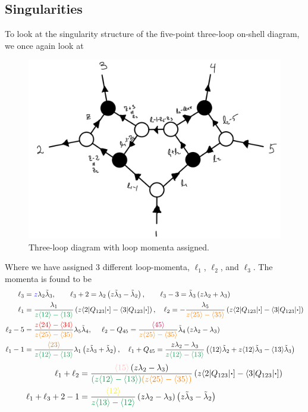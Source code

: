 \documentclass[letter,11pt]{article}
\newcommand{\pink}[1]{\textcolor{pink}{#1}}
\newcommand{\green}[1]{\textcolor{ForestGreen}{#1}}
\newcommand{\orange}[1]{\textcolor{orange}{#1}}
\newcommand{\brown}[1]{\textcolor{brown}{#1}}
\newcommand{\ab}[1]{\langle #1 \rangle}
\newcommand{\aMs}[3]{\langle #1|#2|#3]}  		%
\begin{document}
\subsection{Singularities}
To look at the singularity structure of the five-point three-loop on-shell diagram, we once again  look at 
\begin{figure}[H]
	\centering
	\includegraphics[width=0.5\linewidth]{5pt3l3}
	\caption{Three-loop diagram with loop momenta assigned.}
	\label{fig:5pt3l_2}
\end{figure}
Where we have assigned 3 different loop-momenta, $\ell_1$, $\ell_2$, and $\ell_3$. 
The momenta is found to be
\begin{equation}
	\begin{aligned}
\ell_3&=\textcolor{blue}{z} \lambda_2\tilde\lambda_3,~~~~~~
	\ell_3+2 = \lambda_2\left(z \tilde \lambda_3- \tilde \lambda_2\right)
,~~~~~~
	\ell_3-3 = \tilde \lambda_3\left(z  \lambda_2+ \lambda_3\right)\\
	\ell_1&=\frac{\lambda_1}{\green{z\ab{12}-\ab{13}}}\left(z\aMs{2}{Q_{123}}{\bm\cdot}-\aMs{3}{Q_{123}}{\bm\cdot}\right),~~~
	\ell_2=-\frac{\lambda_5}{\orange{z\ab{25}-\ab{35}}}\left(z\aMs{2}{Q_{123}}{\bm\cdot}-\aMs{3}{Q_{123}}{\bm\cdot}\right)
	\\
	\ell_2-5&=\frac{\textcolor{red}{z\ab{24}-\ab{34}}}{\orange{z\ab{25}-\ab{35}}}\lambda_5\tilde\lambda_4,~~~~\ell_2-Q_{45}=
	\frac{\textcolor{purple}{\ab{45}}}{\textcolor{orange}{z\ab{25}-\ab{35}}}\tilde\lambda_4\left(z\lambda_2-\lambda_3\right)\\
	\ell_1-1&=\frac{\brown{\ab{23}}}{\textcolor{ForestGreen}{z\ab{12}-\ab{13}}}\lambda_1\left(z\tilde \lambda_3+\tilde\lambda_2 \right),~~~
\ell_1+Q_{45}=\frac{z\lambda_2-\lambda_3}{\green{z\ab{12}-\ab{13}}}\left(\ab{12}\tilde \lambda_2+z\ab{12}\tilde \lambda_3-\ab{13}\tilde \lambda_3\right)	
	\end{aligned}
\end{equation}
\begin{equation}
	\begin{aligned}
		\ell_1+\ell_2&=
		\frac{\pink{\ab{15}}\left(z\lambda_2-\lambda_3\right)}{\green{\left(z\ab{12}-\ab{13}\right)}\orange{\left(z\ab{25}-\ab{35}\right)}}\left(z\aMs{2}{Q_{123}}{\bm\cdot}-\aMs{3}{Q_{123}}{\bm\cdot}\right)\\
		\ell_1+\ell_3+2-1&=\frac{\textcolor{yellow}{\ab{12}}}{\green{z\ab{13}-\ab{12}}}
		\left(z \lambda_2-\lambda_3\right)\left(z \tilde\lambda_3-\tilde \lambda_2\right)
	\end{aligned}
\end{equation}
\end{document}
